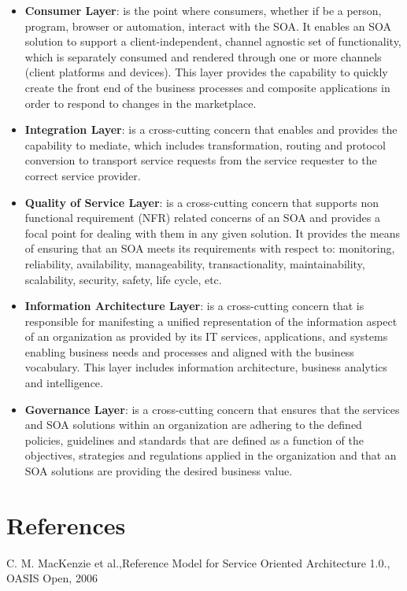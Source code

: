 \documentclass[10pt,a4paper]{article}
\begin{document}
\begin{itemize}
	\item \textbf{Consumer Layer}: is the point where consumers, whether if be a person, program, browser or automation, interact with the SOA. It enables an SOA solution to support a client-independent, channel agnostic set of functionality, which is separately consumed and rendered through one or more channels (client platforms and devices). This layer provides the capability to quickly create the front end of the business processes and composite applications in order to respond to changes in the marketplace.
	\item \textbf{Integration Layer}:  is a cross-cutting concern that enables and provides the capability to mediate, which includes transformation, routing and protocol conversion to transport service requests from the service requester to the correct service provider.
	\item \textbf{Quality of Service Layer}: is a cross-cutting concern that supports non functional requirement (NFR) related concerns of an SOA and provides a focal point for dealing with them in any given solution. It provides the means of ensuring that an SOA meets its requirements with respect to: monitoring, reliability, availability, manageability, transactionality, maintainability, scalability, security, safety, life cycle, etc.
	\item \textbf{Information Architecture Layer}: is a cross-cutting concern that is responsible for manifesting a unified representation of the information aspect of an organization as provided by its IT services, applications, and systems enabling business needs and processes and aligned with the business vocabulary. This layer includes information architecture, business analytics and intelligence.
	\item \textbf{Governance Layer}: is a cross-cutting concern that ensures that the services and SOA solutions within an organization are adhering to the defined policies, guidelines and standards that are defined as a function of the objectives, strategies and regulations applied in the organization and that an SOA solutions are providing the desired business value.
\end{itemize}
\clearpage
\section{References}
\begin{enumerate}[label={[\arabic*]}]
  \item C. M. MacKenzie et al.,Reference Model for Service Oriented
Architecture 1.0., OASIS Open, 2006
\end{enumerate}
\end{document}
